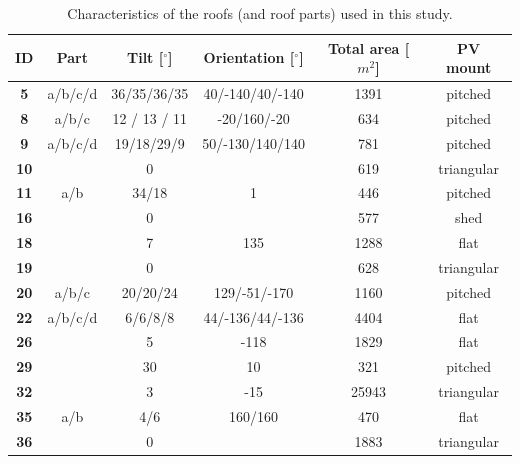 \begin{table}[b]
\centering
\footnotesize
\caption{Characteristics of the roofs (and roof parts) used in this study.}
\label{tab:valid_roofs}
\begin{tabular}{cccccc}
\hline
\textbf{ID} & \textbf{Part} & \textbf{Tilt [$^\circ$]} & \textbf{Orientation [$^\circ$]} & \textbf{Total area [$m^2$]} & \textbf{PV mount} \\ \hline
\textbf{5}  & a/b/c/d       & 36/35/36/35           & 40/-140/40/-140              & 1391                         & pitched           \\
\textbf{8}  & a/b/c         & 12 / 13 / 11          & -20/160/-20                  & 634                          & pitched           \\
\textbf{9}  & a/b/c/d       & 19/18/29/9            & 50/-130/140/140              & 781                          & pitched           \\
\textbf{10} &               & 0                     &                              & 619                          & triangular        \\
\textbf{11} & a/b           & 34/18                 & 1                            & 446                          & pitched           \\
\textbf{16} &               & 0                     &                              & 577                          & shed              \\
\textbf{18} &               & 7                     & 135                          & 1288                         & flat              \\
\textbf{19} &               & 0                     &                              & 628                          & triangular        \\
\textbf{20} & a/b/c         & 20/20/24              & 129/-51/-170                 & 1160                         & pitched           \\
\textbf{22} & a/b/c/d       & 6/6/8/8               & 44/-136/44/-136              & 4404                         & flat              \\
\textbf{26} &               & 5                     & -118                         & 1829                         & flat              \\
\textbf{29} &               & 30                    & 10                           & 321                          & pitched           \\
\textbf{32} &               & 3                     & -15                          & 25943                        & triangular        \\
\textbf{35} & a/b           & 4/6                   & 160/160                      & 470                          & flat              \\
\textbf{36} &               & 0                     &                              & 1883                         & triangular        \\ \hline
\end{tabular}
\end{table}

